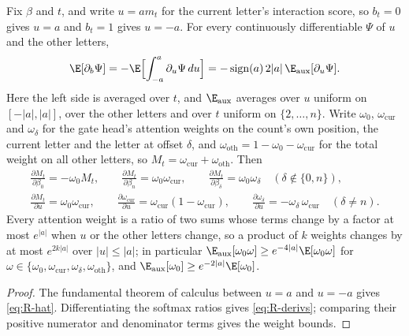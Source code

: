 \begin{lemma}
\label{lem:R-derivatives}
Fix $\beta$ and $t$, and write $u=am_t$ for the current letter's interaction score, so $b_t=0$ gives $u=a$ and $b_t=1$ gives $u=-a$.
For every continuously differentiable $\Psi$ of $u$ and the other letters,
\begin{equation}
 \E[\partial_b\Psi]=-\E\Bigl[\int_{-a}^{a}\partial_u\Psi\,du\Bigr]=-\operatorname{sign}(a)\,2|a|\,\E_{\mathrm{aux}}[\partial_u\Psi].
 \label{eq:R-hat}
\end{equation}
Here the left side is averaged over $t$, and $\E_{\mathrm{aux}}$ averages over $u$ uniform on $[-|a|,|a|]$, over the other letters and over
$t$ uniform on $\{2,\ldots,n\}$. Write $\omega_0$, $\omega_{\mathrm{cur}}$ and $\omega_\delta$ for the gate head's attention weights on the count's own
position, the current letter and the letter at offset $\delta$, and $\omega_{\mathrm{oth}}=1-\omega_0-\omega_{\mathrm{cur}}$ for the total weight on all
other letters, so $M_t=\omega_{\mathrm{cur}}+\omega_{\mathrm{oth}}$. Then
\begin{equation}
 \begin{gathered}
 \frac{\partial M_t}{\partial\beta_0}=-\omega_0M_t,\qquad
 \frac{\partial M_t}{\partial\beta_n}=\omega_0\omega_{\mathrm{cur}},\qquad
 \frac{\partial M_t}{\partial\beta_\delta}=\omega_0\omega_\delta\quad(\delta\notin\{0,n\}),\\
 \frac{\partial M_t}{\partial u}=\omega_0\omega_{\mathrm{cur}},\qquad
 \frac{\partial\omega_{\mathrm{cur}}}{\partial u}=\omega_{\mathrm{cur}}(1-\omega_{\mathrm{cur}}),\qquad
 \frac{\partial\omega_\delta}{\partial u}=-\omega_\delta\,\omega_{\mathrm{cur}}\quad(\delta\ne n).
 \end{gathered}
 \label{eq:R-derivs}
\end{equation}
Every attention weight is a ratio of two sums whose terms change by a factor at most $e^{|a|}$ when $u$ or the other letters
change, so a product of $k$ weights changes by at most $e^{2k|a|}$ over $|u|\le|a|$; in particular
$\E_{\mathrm{aux}}[\omega_0\omega]\ge e^{-4|a|}\E[\omega_0\omega]$ for $\omega\in\{\omega_0,\omega_{\mathrm{cur}},\omega_\delta,\omega_{\mathrm{oth}}\}$, and $\E_{\mathrm{aux}}[\omega_0]\ge e^{-2|a|}\E[\omega_0]$.
\end{lemma}

\begin{proof}
The fundamental theorem of calculus between $u=a$ and $u=-a$ gives \cref{eq:R-hat}.
Differentiating the softmax ratios gives \cref{eq:R-derivs}; comparing their positive numerator and denominator terms gives the weight bounds.
\end{proof}

